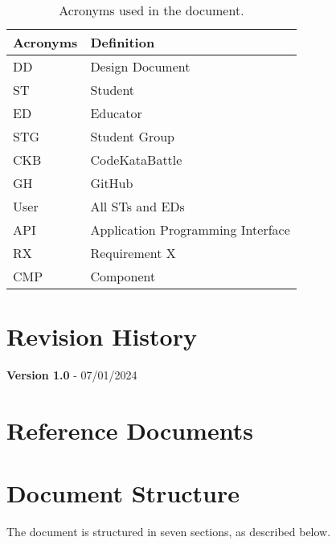 \begin{table}[H]
    \begin{center}
        \begin{tabular}{ |l|l| }
            \hline
            \textbf{Acronyms} & \textbf{Definition}                              \\
            \hline
            DD             & Design Document                      \\
            \hline
            ST              & Student                         \\
            \hline
            ED              & Educator                         \\
            \hline
            STG             & Student Group                    \\
            \hline
            CKB             & CodeKataBattle                   \\
            \hline
            GH              & GitHub                           \\
            \hline
            User            & All STs and EDs                           \\
            \hline
            API             & Application Programming Interface       \\
            \hline
            RX              & Requirement X                           \\
            \hline
            CMP            & Component                           \\
            \hline
         \end{tabular}
        \caption{Acronyms used in the document.}
        \label{tab:acronyms}%
    \end{center}
\end{table}

\section{Revision History}
\label{sec:revision_history}%
\textbf{Version 1.0} - 07/01/2024

\section{Reference Documents}
\label{sec:reference_documents}%

\section{Document Structure}
\label{sec:doc_structure}%
The document is structured in seven sections, as described below.


